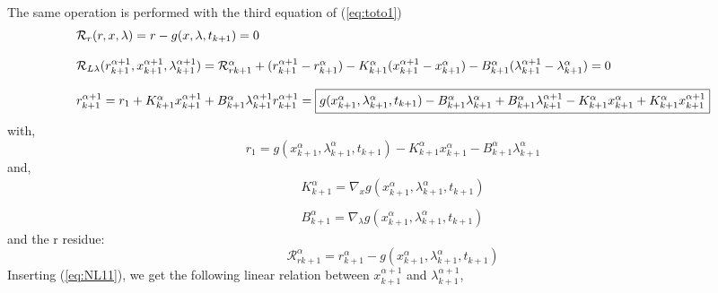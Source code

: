 The same operation is performed with the third equation of (\ref{eq:toto1})
\begin{equation}
   \label{eq:NL9}
   \begin{array}{l}
      \mathcal R_r(r,x,\lambda)=r-g(x,\lambda,t_{k+1}) =0\\ \\
      \mathcal R_{L\lambda}(r^{\alpha+1}_{k+1},x^{\alpha+1}_{k+1},\lambda^{\alpha+1}_{k+1}) = \mathcal
      R_{rk+1}^{\alpha} + (r^{\alpha+1}_{k+1} - r^{\alpha}_{k+1}) -
      K^{\alpha}_{k+1}(x^{\alpha+1}_{k+1} - x^{\alpha}_{k+1})- B^{\alpha}_{k+1}(\lambda^{\alpha+1}_{k+1} -
      \lambda^{\alpha}_{k+1})=0\\ \\
      r^{\alpha+1}_{k+1} = r_1 +K^{\alpha}_{k+1}x^{\alpha+1}_{k+1} +B^{\alpha}_{k+1}
      \lambda^{\alpha+1}_{k+1}
            r^{\alpha+1}_{k+1} = \fbox{$g(x ^{\alpha}_{k+1},\lambda ^{\alpha}_{k+1},t_{k+1}) -B^{\alpha}_{k+1}
      \lambda^{\alpha}_{k+1} + B^{\alpha}_{k+1} \lambda^{\alpha+1}_{k+1}-K^{\alpha}_{k+1}
      x^{\alpha}_{k+1} + K^{\alpha}_{k+1} x^{\alpha+1}_{k+1}$}       

 \end{array}
\end{equation}
with,
\begin{equation}
r_1 = g(x^{\alpha}_{k+1},\lambda ^{\alpha}_{k+1},t_{k+1}) - K^{\alpha}_{k+1} x^{\alpha}_{k+1} -
B^{\alpha}_{k+1} \lambda^{\alpha}_{k+1}
\end{equation}
and,
\begin{equation}
     \begin{array}{l}
  K^{\alpha}_{k+1} = \nabla_xg(x^{\alpha}_{k+1},\lambda ^{\alpha}_{k+1},t_{k+1})  \\ \\
  B^{\alpha}_{k+1} = \nabla_{\lambda}g(x^{\alpha}_{k+1},\lambda ^{\alpha}_{k+1},t_{k+1})
 \end{array}
\end{equation}
and the r residue:
\begin{equation}
\mathcal
      R_{rk+1}^{\alpha} = r^{\alpha}_{k+1} - g(x^{\alpha}_{k+1},\lambda ^{\alpha}_{k+1},t_{k+1})
  \end{equation}
Inserting (\ref{eq:NL11}), we get the following linear relation between $x^{\alpha+1}_{k+1}$ and
$\lambda^{\alpha+1}_{k+1}$, 

